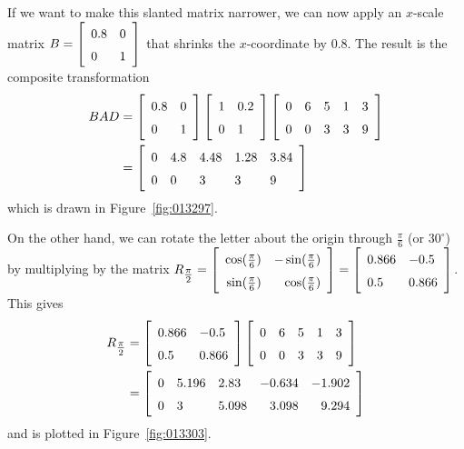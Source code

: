  If we want to make this slanted matrix narrower, we can now apply an $x$-scale matrix $B = \leftB
\begin{array}{ll}
	0.8 & 0\\
	0 & 1
\end{array}
\rightB$ that shrinks the $x$-coordinate by $0.8$. The result is the composite transformation
\begin{align*}
BAD &= \leftB
\begin{array}{ll}
0.8 & 0\\
0 & 1
\end{array}
\rightB \leftB
\begin{array}{ll}
1 & 0.2\\
0 & 1
\end{array}
\rightB \leftB
\begin{array}{rrrrr}
0 & 6 & 5 & 1 & 3\\
0 & 0 & 3 & 3 & 9
\end{array}
\rightB \\ &= 
\leftB
\begin{array}{lllll}
0 & 4.8 & 4.48 & 1.28 & 3.84\\
0 & 0 & 3 & 3 & 9
\end{array}
\rightB
\end{align*}
which is drawn in Figure~\ref{fig:013297}.

On the other hand, we can rotate the letter about the origin through $\frac{\pi}{6}$ (or $30^\circ$) by multiplying by the matrix  $R_{\frac{\pi}{2}} = \leftB
\def\arraystretch{1.5}\begin{array}{rr}
\cos(\frac{\pi}{6}) & -\sin(\frac{\pi}{6})\\
\sin(\frac{\pi}{6}) & \cos(\frac{\pi}{6})
\end{array}
\rightB = \leftB
\begin{array}{ll}
0.866 & -0.5\\
0.5 & 0.866
\end{array}
\rightB$.
This gives
\begin{align*}
R_{\frac{\pi}{2}} &= \leftB
\begin{array}{ll}
0.866 & -0.5\\
0.5 & 0.866
\end{array}
\rightB \leftB
\begin{array}{rrrrr}
0 & 6 & 5 & 1 & 3\\
0 & 0 & 3 & 3 & 9
\end{array}
\rightB \\ &=
\leftB
\begin{array}{lllrr}
0 & 5.196 & 2.83 & -0.634 & -1.902\\
0 & 3 & 5.098 & 3.098 & 9.294
\end{array}
\rightB
\end{align*}
and is plotted in Figure~\ref{fig:013303}.

